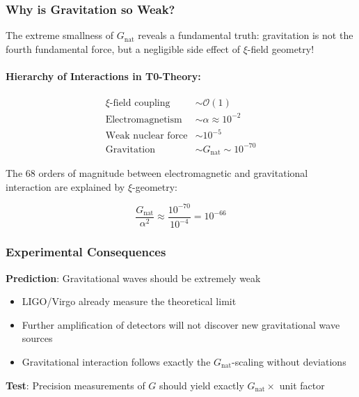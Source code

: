 \documentclass[12pt,a4paper]{article}
\theoremstyle{definition}
\begin{document}
\subsubsection{Why is Gravitation so Weak?}

\begin{revolutionary}
	The extreme smallness of $G_{\text{nat}}$ reveals a fundamental truth: gravitation is not the fourth fundamental force, but a negligible side effect of $\xi$-field geometry!
\end{revolutionary}

\paragraph{Hierarchy of Interactions in T0-Theory:}
\begin{align}
	\xi\text{-field coupling} &\sim \mathcal{O}(1) \\
	\text{Electromagnetism} &\sim \alpha \approx 10^{-2} \\
	\text{Weak nuclear force} &\sim 10^{-5} \\
	\text{Gravitation} &\sim G_{\text{nat}} \sim 10^{-70}
\end{align}

The 68 orders of magnitude between electromagnetic and gravitational interaction are explained by $\xi$-geometry:

\begin{equation}
	\frac{G_{\text{nat}}}{\alpha^2} \approx \frac{10^{-70}}{10^{-4}} = 10^{-66}
\end{equation}

\subsubsection{Experimental Consequences}

\begin{experiment}
	\textbf{Prediction}: Gravitational waves should be extremely weak
	\begin{itemize}
		\item LIGO/Virgo already measure the theoretical limit
		\item Further amplification of detectors will not discover new gravitational wave sources
		\item Gravitational interaction follows exactly the $G_{\text{nat}}$-scaling without deviations
	\end{itemize}
	\textbf{Test}: Precision measurements of $G$ should yield exactly $G_{\text{nat}} \times$ unit factor
\end{experiment}
\end{document}
